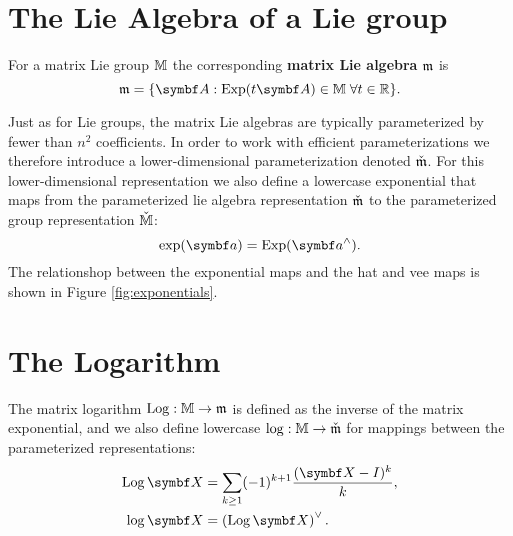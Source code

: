 \section{The Lie Algebra of a Lie group}

\begin{definition}
  For a matrix Lie group $\mathbb{M}$ the corresponding \textbf{matrix Lie algebra} $\mathfrak{m}$ is
  \begin{equation}
    \lM = \{ \A : \Exp(t \A) \in \mathbb{M} \; \forall t \in \mathbb{R} \}.
  \end{equation}
\end{definition}
Just as for Lie groups, the matrix Lie algebras are typically parameterized by fewer than $n^2$ coefficients. In order to work with efficient parameterizations we therefore introduce a lower-dimensional parameterization denoted $\check{\mathfrak{m}}$. For this lower-dimensional representation we also define a lowercase exponential that maps from the parameterized lie algebra representation $\check{\mathfrak{m}}$ to the parameterized group representation $\check{\mathbb{M}}$:
\begin{equation}
  \exp (\a) = \Exp(\a^{\wedge}).
\end{equation}
The relationshop between the exponential maps and the hat and vee maps is shown in Figure \ref{fig:exponentials}.


\section{The Logarithm}

The matrix logarithm $\operatorname{Log} : \mathbb{M} \rightarrow \mathfrak{m}$ is defined as the inverse of the matrix exponential, and we also define lowercase $\log : \mathbb{M} \rightarrow \check{\mathfrak{m}}$ for mappings between the parameterized representations:
\begin{equation}
  \begin{aligned}
    \Log \X & = \sum_{k \geq 1} (-1)^{k+1} \frac{(\X - I)^k}{k}, \\
    \log \X & = \left( \Log \X \right)^{\vee}.
  \end{aligned}
\end{equation}



